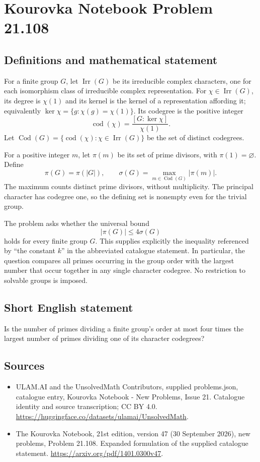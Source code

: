 \documentclass[11pt,a4paper]{article}
\begin{document}
\section*{Kourovka Notebook Problem 21.108}\label{statement}

\subsection{Definitions and mathematical statement}
For a finite group $G$, let $\operatorname{Irr}(G)$ be its irreducible complex characters, one for each isomorphism class of irreducible complex representation. For $\chi\in\operatorname{Irr}(G)$, its degree is $\chi(1)$ and its kernel is the kernel of a representation affording it; equivalently $\ker\chi=\{g:\chi(g)=\chi(1)\}$. Its codegree is the positive integer
\[
 \operatorname{cod}(\chi)=\frac{[G:\ker\chi]}{\chi(1)}.
\]
Let $\operatorname{Cod}(G)=\{\operatorname{cod}(\chi):\chi\in\operatorname{Irr}(G)\}$ be the set of distinct codegrees.

For a positive integer $m$, let $\pi(m)$ be its set of prime divisors, with $\pi(1)=\varnothing$. Define
\[
 \pi(G)=\pi(|G|),\qquad
 \sigma(G)=\max_{m\in\operatorname{Cod}(G)}|\pi(m)|.
\]
The maximum counts distinct prime divisors, without multiplicity. The principal character has codegree one, so the defining set is nonempty even for the trivial group.

The problem asks whether the universal bound
\[
 |\pi(G)|\le4\sigma(G)
\]
holds for every finite group $G$. This supplies explicitly the inequality referenced by ``the constant $k$'' in the abbreviated catalogue statement. In particular, the question compares all primes occurring in the group order with the largest number that occur together in any single character codegree. No restriction to solvable groups is imposed.
\subsection{Short English statement}
Is the number of primes dividing a finite group’s order at most four times the largest number of primes dividing one of its character codegrees?
\subsection{Sources}
\begin{itemize}
\item[S1] ULAM.AI and the UnsolvedMath Contributors, supplied problems.json, catalogue entry, Kourovka Notebook - New Problems, Issue 21. Catalogue identity and source transcription; CC BY 4.0.
\url{https://huggingface.co/datasets/ulamai/UnsolvedMath}.
\item[S2] The Kourovka Notebook, 21st edition, version 47 (30 September 2026), new problems, Problem 21.108. Expanded formulation of the supplied catalogue statement.
\url{https://arxiv.org/pdf/1401.0300v47}.
\end{itemize}
\end{document}
